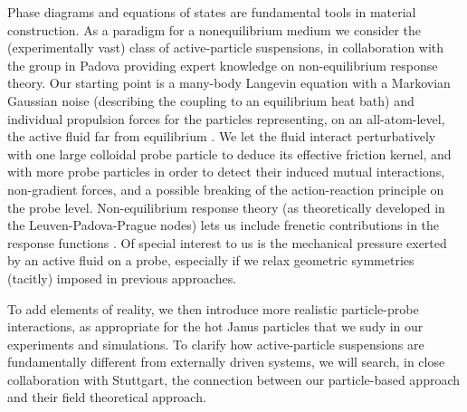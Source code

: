 \begin{workpackage}[id=WPactive,wphases=0-48,
  short=Active Particle Suspensions,%
  title=Probing active particle suspensions with colloids and polymers,
  lead=ULEI,
  ULEIRM=96,UNIPDRM=6,USTUTTRM=2]
\begin{tasklist}
\begin{task}[title=Nonequilibrium equations of state (NEOS),id=task1,PM=8,lead=ULEI,partners={UNIPD,USTUTT},
wphases=0-48!0.5]
Phase diagrams and equations of states are fundamental tools in material construction.
As a paradigm for a nonequilibrium medium we consider the (experimentally vast) class of
active-particle suspensions, in collaboration with the group in Padova providing expert knowledge on 
non-equilibrium response theory.
%
Our starting point is a many-body Langevin equation with a Markovian Gaussian noise
(describing the coupling to an equilibrium heat bath) and individual propulsion forces for
the particles representing, on an all-atom-level, the active fluid far from equilibrium \cite{solon-etal:2015}. 
%
We let the fluid interact perturbatively with one large colloidal probe particle to
deduce its effective friction kernel, and with more probe particles in order to
detect their induced mutual interactions, non-gradient forces, and a possible breaking of
the action-reaction principle on the probe level.  
%
Non-equilibrium response theory (as theoretically developed in the Leuven-Padova-Prague nodes) lets us include frenetic contributions in the response 
functions \cite{baiesi-wynants:2009}.
%
Of special interest to us is the mechanical pressure exerted by an active fluid on a probe, 
especially if we relax geometric symmetries (tacitly) imposed in previous approaches.

To add elements of reality, we then introduce more realistic particle-probe interactions, as appropriate for the hot 
Janus particles that we sudy in our experiments and simulations.
%
To clarify how active-particle suspensions are fundamentally different from externally driven systems, 
we will search, in close collaboration with Stuttgart, the connection between our particle-based approach 
and their field theoretical approach.

\end{task}


\end{tasklist}
\end{workpackage}
